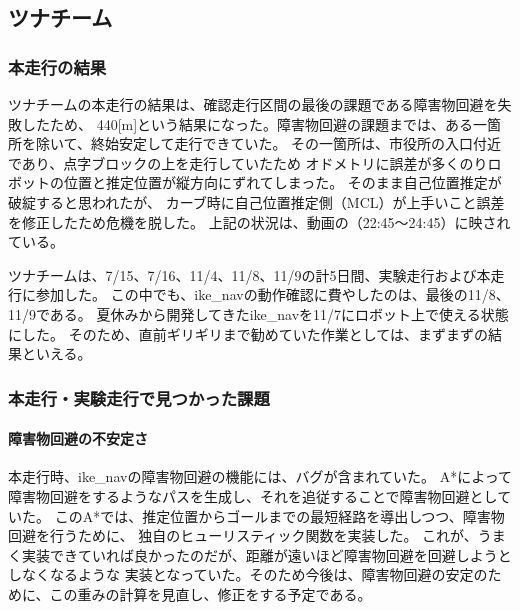 \documentclass[twocolumn,9pt]{jsproceedings}
\begin{document}


\subsection{ツナチーム}
\subsubsection{本走行の結果}
ツナチームの本走行の結果は、確認走行区間の最後の課題である障害物回避を失敗したため、
440[m]という結果になった。障害物回避の課題までは、ある一箇所を除いて、終始安定して走行できていた。
その一箇所は、市役所の入口付近であり、点字ブロックの上を走行していたため
オドメトリに誤差が多くのりロボットの位置と推定位置が縦方向にずれてしまった。
そのまま自己位置推定が破綻すると思われたが、
カーブ時に自己位置推定側（MCL）が上手いこと誤差を修正したため危機を脱した。
上記の状況は、動画\cite{ike_nav_loc_youtube}の（22:45〜24:45）に映されている。

ツナチームは、7/15、7/16、11/4、11/8、11/9の計5日間、実験走行および本走行に参加した。
この中でも、ike\_navの動作確認に費やしたのは、最後の11/8、11/9である。
夏休みから開発してきたike\_navを11/7にロボット上で使える状態にした。
そのため、直前ギリギリまで勧めていた作業としては、まずまずの結果といえる。

\subsubsection{本走行・実験走行で見つかった課題}
\paragraph{障害物回避の不安定さ}
本走行時、ike\_navの障害物回避の機能には、バグが含まれていた。
A*によって障害物回避をするようなパスを生成し、それを追従することで障害物回避としていた。
このA*では、推定位置からゴールまでの最短経路を導出しつつ、障害物回避を行うために、
独自のヒューリスティック関数を実装した。
これが、うまく実装できていれば良かったのだが、距離が遠いほど障害物回避を回避しようとしなくなるような
実装となっていた。そのため今後は、障害物回避の安定のために、この重みの計算を見直し、修正をする予定である。
\end{document}
